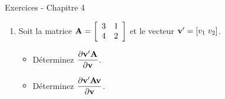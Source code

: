 \documentclass[letter, 11pt]{article}
\begin{document}
\vspace*{0.01 cm}
\begin{center}
{\Large Exercices - Chapitre 4}
\end{center}




\begin{enumerate}[leftmargin=*, wide, label=\bf Exercice \arabic*:]

\item Soit la matrice $\bold{A}=\left[\begin{array}{cc}3&1\\4&2\end{array}\right]$ et le vecteur $\bold{v}'=[v_1\;v_2]$.

\bigskip
    \begin{itemize}
    \item[(a)] Déterminez $\dfrac{\partial \bold{v'A}}{\partial \bold{v}}$.
    \item[(b)] Déterminez $\dfrac{\partial \bold{v'Av}}{\partial \bold{v}}$.
    \end{itemize}


\end{enumerate}
\end{document}
